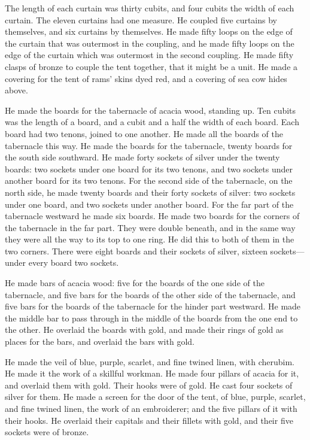 {The length of each curtain was thirty cubits, and four cubits the width of each curtain. The eleven curtains had one measure.
He coupled five curtains by themselves, and six curtains by themselves.
He made fifty loops on the edge of the curtain that was outermost in the coupling, and he made fifty loops on the edge of the curtain which was outermost in the second coupling.
He made fifty clasps of bronze to couple the tent together, that it might be a unit.
He made a covering for the tent of rams’ skins dyed red, and a covering of sea cow hides above.
\par }{\PP {}He made the boards for the tabernacle of acacia wood, standing up.
Ten cubits was the length of a board, and a cubit and a half the width of each board.
Each board had two tenons, joined to one another. He made all the boards of the tabernacle this way.
He made the boards for the tabernacle, twenty boards for the south side southward.
He made forty sockets of silver under the twenty boards: two sockets under one board for its two tenons, and two sockets under another board for its two tenons.
For the second side of the tabernacle, on the north side, he made twenty boards
and their forty sockets of silver: two sockets under one board, and two sockets under another board.
For the far part of the tabernacle westward he made six boards.
He made two boards for the corners of the tabernacle in the far part.
They were double beneath, and in the same way they were all the way to its top to one ring. He did this to both of them in the two corners.
There were eight boards and their sockets of silver, sixteen sockets—under every board two sockets.
\par }{\PP {}He made bars of acacia wood: five for the boards of the one side of the tabernacle,
and five bars for the boards of the other side of the tabernacle, and five bars for the boards of the tabernacle for the hinder part westward.
He made the middle bar to pass through in the middle of the boards from the one end to the other.
He overlaid the boards with gold, and made their rings of gold as places for the bars, and overlaid the bars with gold.
\par }{\PP {}He made the veil of blue, purple, scarlet, and fine twined linen, with cherubim. He made it the work of a skillful workman.
He made four pillars of acacia for it, and overlaid them with gold. Their hooks were of gold. He cast four sockets of silver for them.
He made a screen for the door of the tent, of blue, purple, scarlet, and fine twined linen, the work of an embroiderer;
and the five pillars of it with their hooks. He overlaid their capitals and their fillets with gold, and their five sockets were of bronze.

}
